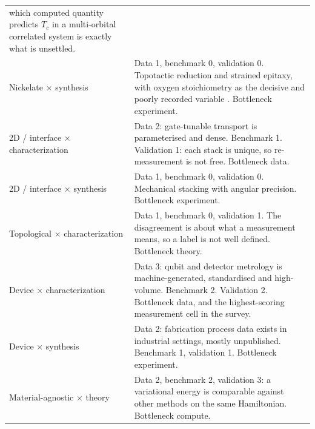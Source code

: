 \documentclass[
  11pt,
]{article}
\begin{document}
{\begin{longtable}[]{@{}
  >{\raggedright\arraybackslash}p{}
  >{\raggedright\arraybackslash}p{}@{}}
which computed quantity predicts \(T_c\) in a multi-orbital correlated
system is exactly what is unsettled. \\
Nickelate × synthesis & Data 1, benchmark 0, validation 0. Topotactic
reduction and strained epitaxy, with oxygen stoichiometry as the
decisive and poorly recorded variable \citep{zhou2023investigations}.
Bottleneck experiment. \\
2D / interface × characterization & Data 2: gate-tunable transport is
parameterised and dense. Benchmark 1. Validation 1: each stack is
unique, so re-measurement is not free. Bottleneck data. \\
2D / interface × synthesis & Data 1, benchmark 0, validation 0.
Mechanical stacking with angular precision. Bottleneck experiment. \\
Topological × characterization & Data 1, benchmark 0, validation 1. The
disagreement is about what a measurement means, so a label is not well
defined. Bottleneck theory. \\
Device × characterization & Data 3: qubit and detector metrology is
machine-generated, standardised and high-volume. Benchmark 2. Validation
2. Bottleneck data, and the highest-scoring measurement cell in the
survey. \\
Device × synthesis & Data 2: fabrication process data exists in
industrial settings, mostly unpublished. Benchmark 1, validation 1.
Bottleneck experiment. \\
Material-agnostic × theory & Data 2, benchmark 2, validation 3: a
variational energy is comparable against other methods on the same
Hamiltonian. Bottleneck compute. \\
\end{longtable}
}


\end{document}
